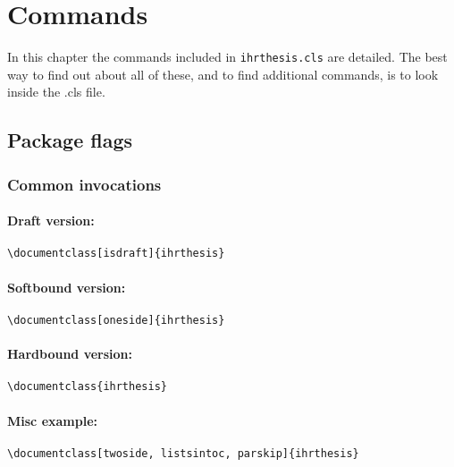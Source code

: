 \chapter{Commands}

\begin{chapabstract}
In this chapter the commands included in \verb|ihrthesis.cls| are detailed. The best way to find out about all of these, and to find additional commands, is to look inside the .cls file.
\end{chapabstract}


\section{Package flags}

\subsection{Common invocations}

\subsubsection*{Draft version:}
\begin{verbatim}
\documentclass[isdraft]{ihrthesis}
\end{verbatim}

\subsubsection*{Softbound version:}
\begin{verbatim}
\documentclass[oneside]{ihrthesis}
\end{verbatim}

\subsubsection*{Hardbound version:}
\begin{verbatim}
\documentclass{ihrthesis}
\end{verbatim}

\subsubsection*{Misc example:}
\begin{verbatim}
\documentclass[twoside, listsintoc, parskip]{ihrthesis}
\end{verbatim}

